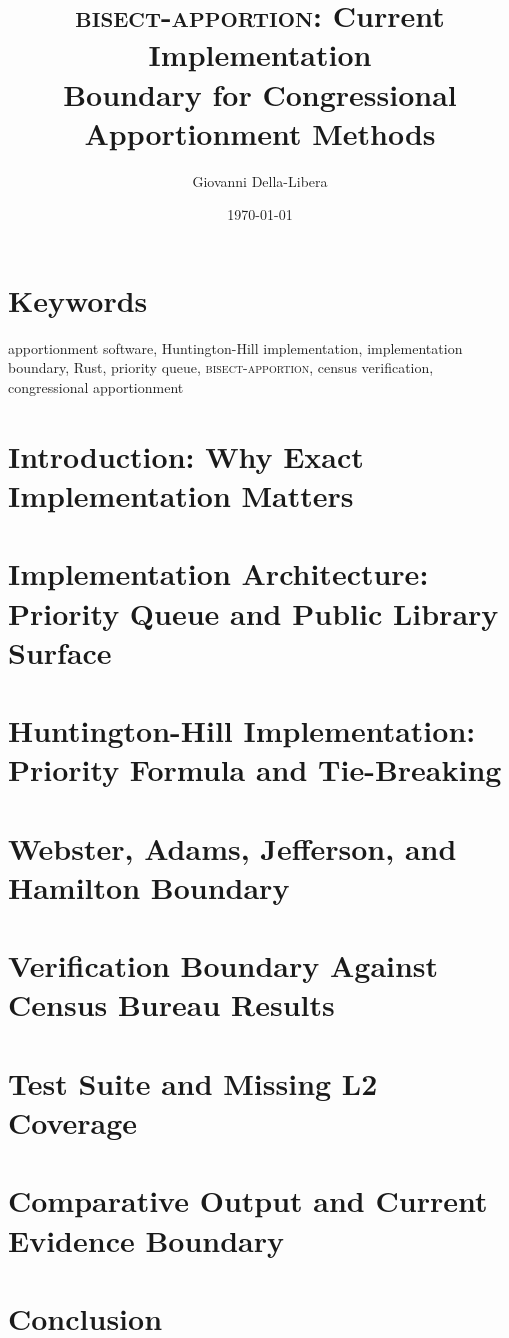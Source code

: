 \documentclass[12pt]{article}
\title{\textbf{\textsc{bisect-apportion}: Current Implementation\\
Boundary for Congressional Apportionment Methods}}
\author{Giovanni Della-Libera}
\date{\today}
\begin{document}
\maketitle

\begin{abstract}

\end{abstract}

\section*{Keywords}
apportionment software, Huntington-Hill implementation, implementation boundary,
Rust, priority queue, \textsc{bisect-apportion}, census verification,
congressional apportionment

\section{Introduction: Why Exact Implementation Matters}


\section{Implementation Architecture: Priority Queue and Public Library Surface}


\section{Huntington-Hill Implementation: Priority Formula and Tie-Breaking}


\section{Webster, Adams, Jefferson, and Hamilton Boundary}


\section{Verification Boundary Against Census Bureau Results}


\section{Test Suite and Missing L2 Coverage}


\section{Comparative Output and Current Evidence Boundary}


\section{Conclusion}




\end{document}

